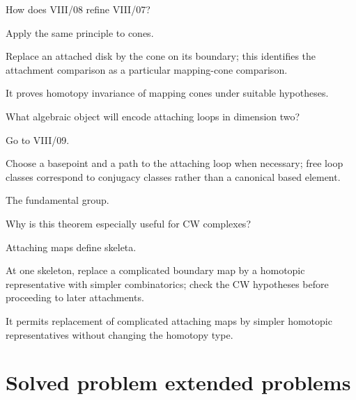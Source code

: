 \begin{exercise}\label{exr:viii08-22}
How does VIII/08 refine VIII/07?
\end{exercise}
\begin{hint}
Apply the same principle to cones.

Replace an attached disk by the cone on its boundary; this identifies the attachment comparison as a particular mapping-cone comparison.
\end{hint}
\begin{solution}
It proves homotopy invariance of mapping cones under suitable hypotheses.
\end{solution}

\begin{exercise}\label{exr:viii08-23}
What algebraic object will encode attaching loops in dimension two?
\end{exercise}
\begin{hint}
Go to VIII/09.

Choose a basepoint and a path to the attaching loop when necessary; free loop classes correspond to conjugacy classes rather than a canonical based element.
\end{hint}
\begin{solution}
The fundamental group.
\end{solution}

\begin{exercise}\label{exr:viii08-24}
Why is this theorem especially useful for CW complexes?
\end{exercise}
\begin{hint}
Attaching maps define skeleta.

At one skeleton, replace a complicated boundary map by a homotopic representative with simpler combinatorics; check the CW hypotheses before proceeding to later attachments.
\end{hint}
\begin{solution}
It permits replacement of complicated attaching maps by simpler homotopic representatives without changing the homotopy type.
\end{solution}


\section{Solved problem extended problems}

